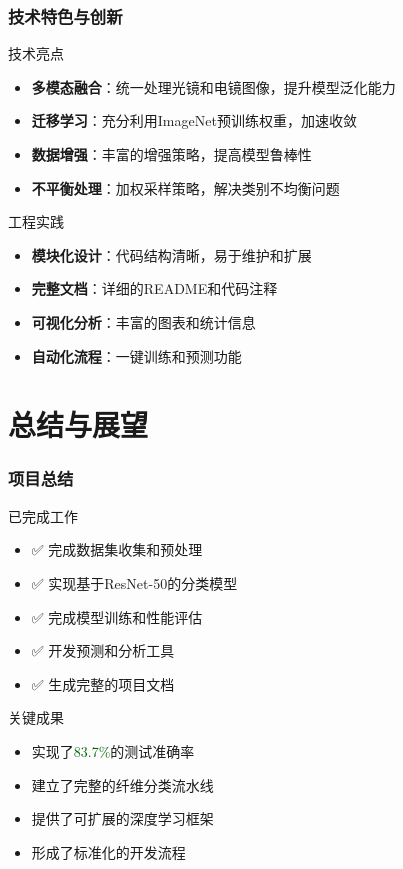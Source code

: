 \documentclass[12pt]{beamer}
\begin{document}
\begin{frame}
\frametitle{技术特色与创新}
\begin{block}{技术亮点}
\begin{itemize}
    \item \textbf{多模态融合}：统一处理光镜和电镜图像，提升模型泛化能力
    \item \textbf{迁移学习}：充分利用ImageNet预训练权重，加速收敛
    \item \textbf{数据增强}：丰富的增强策略，提高模型鲁棒性
    \item \textbf{不平衡处理}：加权采样策略，解决类别不均衡问题
\end{itemize}
\end{block}

\begin{block}{工程实践}
\begin{itemize}
    \item \textbf{模块化设计}：代码结构清晰，易于维护和扩展
    \item \textbf{完整文档}：详细的README和代码注释
    \item \textbf{可视化分析}：丰富的图表和统计信息
    \item \textbf{自动化流程}：一键训练和预测功能
\end{itemize}
\end{block}
\end{frame}

\section{总结与展望}

\begin{frame}
\frametitle{项目总结}
\begin{block}{已完成工作}
\begin{itemize}
    \item ✅ 完成数据集收集和预处理
    \item ✅ 实现基于ResNet-50的分类模型
    \item ✅ 完成模型训练和性能评估
    \item ✅ 开发预测和分析工具
    \item ✅ 生成完整的项目文档
\end{itemize}
\end{block}

\begin{block}{关键成果}
\begin{itemize}
    \item 实现了\textcolor{darkgreen}{83.7\%}的测试准确率
    \item 建立了完整的纤维分类流水线
    \item 提供了可扩展的深度学习框架
    \item 形成了标准化的开发流程
\end{itemize}
\end{block}
\end{frame}
\end{document}

